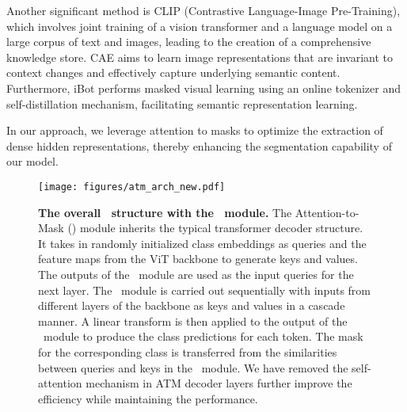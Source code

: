 Another significant method is CLIP \cite{radford2021learning} (Contrastive Language-Image Pre-Training), which involves joint training of a vision transformer and a language model on a large corpus of text and images, leading to the creation of a comprehensive knowledge store. CAE \cite{chen2022context} aims to learn image representations that are invariant to context changes and effectively capture underlying semantic content. Furthermore, iBot \cite{zhou2021ibot} performs masked visual learning using an online tokenizer and self-distillation mechanism, facilitating semantic representation learning.

In our approach, we leverage attention to masks to optimize the extraction of dense hidden representations, thereby enhancing the segmentation capability of our model.




\begin{figure*}[h]
    \centering
    
    \texttt{[image: figures/atm\_arch\_new.pdf]}
    \caption{\textbf{The overall \seg\ structure with the \atm\ module.}
    The Attention-to-Mask (\atm) module  inherits the typical transformer decoder structure. It takes in  randomly initialized class embeddings as queries and the feature maps from the ViT backbone to generate keys and values. The outputs of the \atm\ module are used as the input queries for the next layer.
    The \atm\ module is carried out sequentially with inputs from different layers of the backbone as keys and values in a cascade manner. 
    A linear transform is then applied to the output of the 
    \atm\ module to produce the class predictions for each token. The mask for the corresponding class is transferred from the similarities between queries and keys in the \atm\ module. We have removed the self-attention mechanism in ATM decoder layers further improve the efficiency while maintaining the performance.
    }
    \label{fig:atm_decoder}
\end{figure*}


